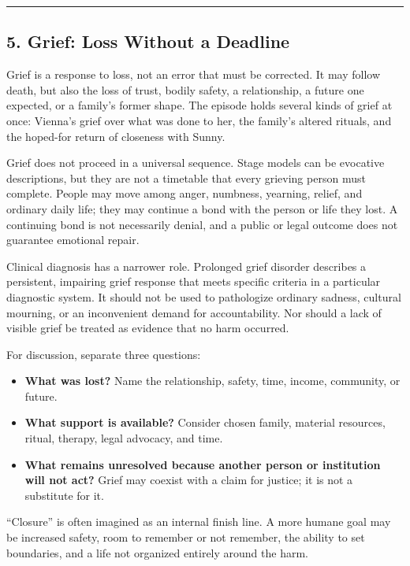 \documentclass[
  11pt,
  letterpaper,
]{article}
\providecommand{\tightlist}{%
  \setlength{\itemsep}{0pt}\setlength{\parskip}{0pt}}
\begin{document}
\begin{center}\rule{0.5\linewidth}{0.5pt}\end{center}

\subsection{5. Grief: Loss Without a
Deadline}\label{grief-loss-without-a-deadline}

Grief is a response to loss, not an error that must be corrected. It may
follow death, but also the loss of trust, bodily safety, a relationship,
a future one expected, or a family's former shape. The episode holds
several kinds of grief at once: Vienna's grief over what was done to
her, the family's altered rituals, and the hoped-for return of closeness
with Sunny.

Grief does not proceed in a universal sequence. Stage models can be
evocative descriptions, but they are not a timetable that every grieving
person must complete. People may move among anger, numbness, yearning,
relief, and ordinary daily life; they may continue a bond with the
person or life they lost. A continuing bond is not necessarily denial,
and a public or legal outcome does not guarantee emotional repair.

Clinical diagnosis has a narrower role. Prolonged grief disorder
describes a persistent, impairing grief response that meets specific
criteria in a particular diagnostic system. It should not be used to
pathologize ordinary sadness, cultural mourning, or an inconvenient
demand for accountability. Nor should a lack of visible grief be treated
as evidence that no harm occurred.

For discussion, separate three questions:

\begin{itemize}
\tightlist
\item
  \textbf{What was lost?} Name the relationship, safety, time, income,
  community, or future.
\item
  \textbf{What support is available?} Consider chosen family, material
  resources, ritual, therapy, legal advocacy, and time.
\item
  \textbf{What remains unresolved because another person or institution
  will not act?} Grief may coexist with a claim for justice; it is not a
  substitute for it.
\end{itemize}

``Closure'' is often imagined as an internal finish line. A more humane
goal may be increased safety, room to remember or not remember, the
ability to set boundaries, and a life not organized entirely around the
harm.
\end{document}
